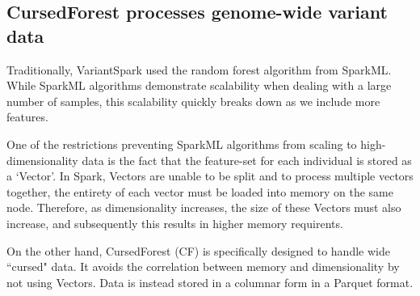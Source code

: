 \documentclass[10pt,letterpaper]{article}
\begin{document}
\begin{figure}[tbhp]
\begin{tabular}{ll}
 \end{tabular}
  \label{figure:synth}
\end{figure}


\subsection*{CursedForest processes genome-wide variant data}

Traditionally, VariantSpark used the random forest algorithm from SparkML. While SparkML algorithms demonstrate
scalability when dealing with a large number of samples, this scalability quickly breaks down as we include more features.

One of the restrictions preventing SparkML algorithms from scaling to high-dimensionality data is the fact that the feature-set
for each individual is stored as a `Vector'. In Spark, Vectors are unable to be split and to process multiple vectors together,
the entirety of each vector must be loaded into memory on the same node. Therefore, as dimensionality increases, the
size of these Vectors must also increase, and subsequently this results in higher memory requirents.

On the other hand, CursedForest (CF) is specifically designed to handle wide ``cursed" data. It avoids the correlation between
memory and dimensionality by not using Vectors. Data is instead stored in a columnar form in a Parquet format.
\end{document}
